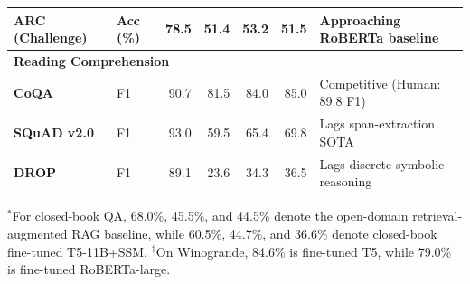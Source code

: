 \documentclass[../../main.tex]{subfiles}
\begin{document}
\begin{table}[t]
\begin{tabularx}{\textwidth}{l l r r r r X}
\textbf{ARC (Challenge)} & Acc (\%) & 78.5 & 51.4 & 53.2 & 51.5 & Approaching RoBERTa baseline \\
\midrule
\multicolumn{7}{l}{\textbf{Reading Comprehension}} \\
\textbf{CoQA} & F1 & 90.7 & 81.5 & 84.0 & 85.0 & Competitive (Human: 89.8 F1) \\
\textbf{SQuAD v2.0} & F1 & 93.0 & 59.5 & 65.4 & 69.8 & Lags span-extraction SOTA \\
\textbf{DROP} & F1 & 89.1 & 23.6 & 34.3 & 36.5 & Lags discrete symbolic reasoning \\
\bottomrule
\end{tabularx}
\begin{flushleft}
\footnotesize $^*$For closed-book QA, 68.0\%, 45.5\%, and 44.5\% denote the open-domain retrieval-augmented RAG baseline, while 60.5\%, 44.7\%, and 36.6\% denote closed-book fine-tuned T5-11B+SSM. $^\dagger$On Winogrande, 84.6\% is fine-tuned T5, while 79.0\% is fine-tuned RoBERTa-large.
\end{flushleft}
\end{table}
\end{document}
